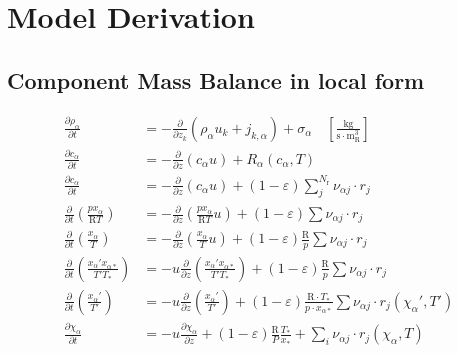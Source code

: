 \section{Model Derivation}

\subsection{Component Mass Balance in local form}
\begin{equation}
    \label{app:eq:component-mass-balance}
    \begin{aligned}
        \frac{\partial \rho_{\alpha}}{\partial t} &=
        -\frac{\partial}{\partial z_k} \left( \rho_{\alpha} u_k + j_{k,\alpha} \right)
        + \sigma_{\alpha} \quad \left[ \frac{\text{kg}}{\text{s} \cdot \text{m}_\text{R}^3} \right] \\
        \frac{\partial c_{\alpha}}{\partial t} &= 
        -\frac{\partial}{\partial z} \left( c_{\alpha} u \right) +
        R_\alpha (c_{\alpha}, T) \\
        \frac{\partial c_{\alpha}}{\partial t} &=
         - \frac{\partial}{\partial z} \left( c_{\alpha} u \right) +
         (1-\varepsilon) \sum_{j}^{N_\text{r}} \nu_{\alpha j} \cdot r_j \\
        \frac{\partial}{\partial t} \left( \frac{p x_{\alpha}}{\mathrm{R}T} \right) &= 
        -\frac{\partial}{\partial z} \left( \frac{p x_{\alpha}}{\mathrm{R}T} u \right) +
        (1-\varepsilon) \sum \nu_{\alpha j} \cdot r_{j} \\
        \frac{\partial}{\partial t} \left( \frac{x_{\alpha}}{T} \right) &=
         -\frac{\partial}{\partial z} \left( \frac{x_{\alpha}}{T} u \right) +
         (1-\varepsilon) \frac{\mathrm{R}}{p} \sum \nu_{\alpha j} \cdot r_{j} \\
        \frac{\partial}{\partial t} \left( \frac{x_{\alpha}' x_{\alpha *}}{T' T_*} \right) &= 
        -u \frac{\partial}{\partial z} \left( \frac{x_{\alpha}' x_{\alpha *}}{T' T_*} \right) +
        (1-\varepsilon) \frac{\mathrm{R}}{p} \sum \nu_{\alpha j} \cdot r_j \\
        \frac{\partial}{\partial t} \left( \frac{x_{\alpha}'}{T'} \right) &=
         -u \frac{\partial}{\partial z} \left( \frac{x_{\alpha}'}{T'} \right) +
         (1-\varepsilon) \frac{\mathrm{R} \cdot T_*}{p \cdot x_{\alpha *}}
         \sum \nu_{\alpha j} \cdot r_j (\chi_{\alpha}', T') \\
        \frac{\partial \chi_{\alpha}}{\partial t} &= 
        - u \frac{\partial \chi_{\alpha}}{\partial z} +
        (1-\varepsilon) \frac{\mathrm{R}}{P} \frac{T_*}{x_*}
        + \sum_i \nu_{\alpha j} \cdot r_j (\chi_{\alpha}, T)
    \end{aligned}
\end{equation}

